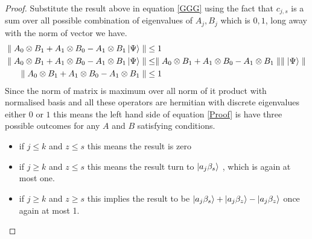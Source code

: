 \begin{proof}
Substitute the result above in equation \ref{GGG}  using the fact that $c_{j,s}$ is a sum over all possible combination of eigenvalues of $A_j,B_j$ which is $0,1$, long away with the  norm of vector we have.
\begin{align}\label{Proof}
\parallel A_0\otimes B_1+A_1\otimes B_0-A_1\otimes B_1 \ket{\Psi} \parallel & \leq 1\nonumber\\
\parallel A_0\otimes B_1+A_1\otimes B_0-A_1\otimes B_1 \ket{\Psi} \parallel& \leq \parallel A_0\otimes B_1+A_1\otimes B_0-A_1\otimes B_1\parallel \parallel \ket{\Psi} \parallel\nonumber\\
\parallel A_0\otimes B_1+A_1\otimes B_0-A_1\otimes B_1\parallel& \leq  1
\end{align}
Since the norm of matrix is maximum over all norm of it product with normalised basis and all these operators are hermitian with discrete eigenvalues either $0$ or $1$ this means the left hand side of equation \ref{Proof} is have three possible outcomes for any $A$ and $B$ satisfying conditions.
\begin{itemize}
\item if $j\leq k$ and $z\leq s$ this means the result is zero
\item if $j\geqslant k$ and $z\leq s$ this means the result turn to $\ket{a_j \beta_s}$ , which is again at most one.
\item if $j\geqslant k$ and $z\geqslant s$ this implies the result to be $\ket{a_j \beta_s}+ \ket{a_j \beta_z}- \ket{a_j \beta_z}$ once again at most 1.
\end{itemize}
\end{proof}